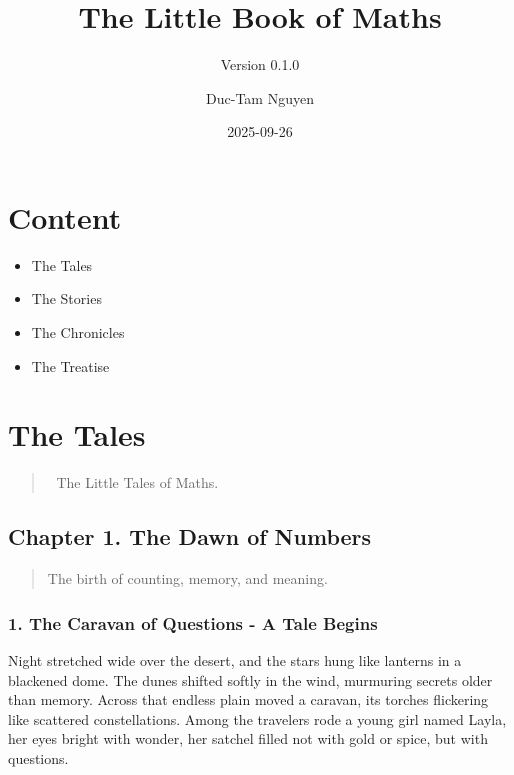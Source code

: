 \documentclass[
  letterpaper,
  DIV=11,
  numbers=noendperiod]{scrreprt}
\title{The Little Book of Maths}
\subtitle{Version 0.1.0}
\author{Duc-Tam Nguyen}
\date{2025-09-26}
\providecommand{\tightlist}{%
  \setlength{\itemsep}{0pt}\setlength{\parskip}{0pt}}
\renewcommand*\contentsname{Table of contents}
\newcommand\contentsname{Table of contents}
\begin{document}
\maketitle

\renewcommand*\contentsname{Table of contents}
{
\hypersetup{linkcolor=}
\setcounter{tocdepth}{2}
\tableofcontents
}


\chapter{Content}\label{content}

\begin{itemize}
\tightlist
\item
  The Tales
\item
  The Stories
\item
  The Chronicles
\item
  The Treatise
\end{itemize}


\chapter{The Tales}\label{the-tales}

\begin{quote}
🌱 The Little Tales of Maths.
\end{quote}

\section{Chapter 1. The Dawn of
Numbers}\label{chapter-1.-the-dawn-of-numbers}

\begin{quote}
The birth of counting, memory, and meaning.
\end{quote}

\subsection{1. The Caravan of Questions - A Tale
Begins}\label{the-caravan-of-questions---a-tale-begins}

Night stretched wide over the desert, and the stars hung like lanterns
in a blackened dome. The dunes shifted softly in the wind, murmuring
secrets older than memory. Across that endless plain moved a caravan,
its torches flickering like scattered constellations. Among the
travelers rode a young girl named Layla, her eyes bright with wonder,
her satchel filled not with gold or spice, but with questions.
\end{document}
